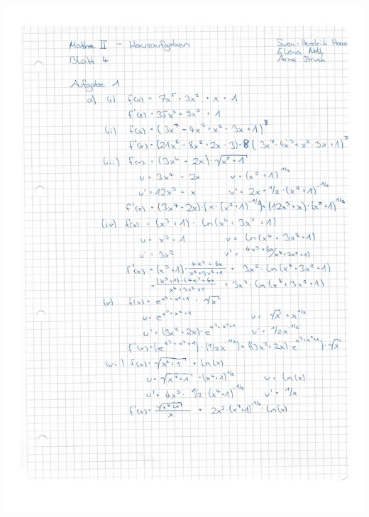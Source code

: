 \documentclass[a4paper]{scrartcl}
\title{\titleinfo}
\author{Elena Noll, Sven-Hendrik Haase, Arne Struck}
\date{\today}
\begin{document}
\maketitle

\centerline{\includegraphics{Homework-2012-05-03-1.pdf}}
\end{document}
